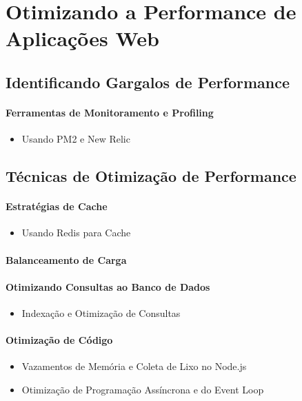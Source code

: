 
\chapter{Otimizando a Performance de Aplicações Web}
\section{Identificando Gargalos de Performance}

\subsubsection{Ferramentas de Monitoramento e Profiling}
\begin{itemize}
\item Usando PM2 e New Relic
\end{itemize}


\section{Técnicas de Otimização de Performance}

\subsubsection{Estratégias de Cache}
\begin{itemize}
\item Usando Redis para Cache
\end{itemize}
\subsubsection{Balanceamento de Carga}
\subsubsection{Otimizando Consultas ao Banco de Dados}
\begin{itemize}
\item Indexação e Otimização de Consultas
\end{itemize}
\subsubsection{Otimização de Código}
\begin{itemize}
\item Vazamentos de Memória e Coleta de Lixo no Node.js
\item Otimização de Programação Assíncrona e do Event Loop
\end{itemize}



